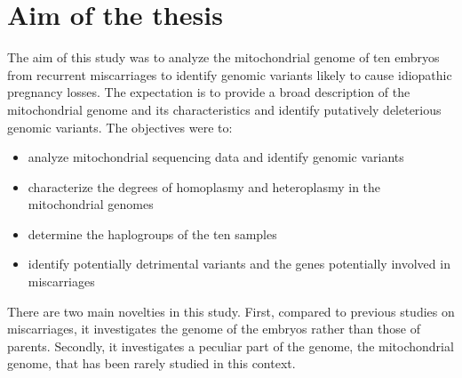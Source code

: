\chapter{Aim of the thesis }



The aim of this study was to analyze the mitochondrial genome of ten embryos from recurrent miscarriages to identify genomic variants likely to cause idiopathic pregnancy losses. The expectation is to provide a broad description of the mitochondrial genome and its characteristics and identify putatively deleterious genomic variants. 
The objectives were to: 

\begin{itemize}
\item  analyze mitochondrial sequencing data and identify genomic variants
\item  characterize the degrees of homoplasmy and heteroplasmy in the mitochondrial genomes 
\item determine the haplogroups of the ten samples
\item identify potentially detrimental variants and the genes potentially involved in miscarriages
\end{itemize}
There are two main novelties in this study. First, compared to previous studies on miscarriages, it investigates the genome of the embryos rather than those of parents. Secondly, it investigates a peculiar part of the genome, the mitochondrial genome, that has been rarely studied in this context. 










